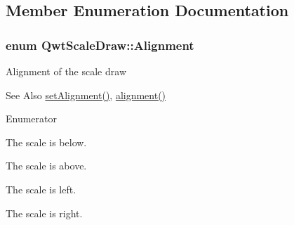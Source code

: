 \subsection{Member Enumeration Documentation}
\hypertarget{class_qwt_scale_draw_acd7ceeeac592ef08530788580b461c66}{
\subsubsection[{Alignment}]{\setlength{\rightskip}{0pt plus 5cm}enum {\bf Qwt\-Scale\-Draw\-::\-Alignment}}}\label{class_qwt_scale_draw_acd7ceeeac592ef08530788580b461c66}
Alignment of the scale draw \begin{DoxySeeAlso}{See Also}
\hyperlink{class_qwt_scale_draw_a7a4de0055dc1358e55c3357366a54091}{set\-Alignment()}, \hyperlink{class_qwt_scale_draw_ad0425d29e919f60021322b178661b6e5}{alignment()} 
\end{DoxySeeAlso}
\begin{Desc}
\item[Enumerator]\par
\begin{description}
\item[{\em 
\hypertarget{class_qwt_scale_draw_acd7ceeeac592ef08530788580b461c66a0e16389e135da75f06117d1ee3ef765f}{Bottom\-Scale}\label{class_qwt_scale_draw_acd7ceeeac592ef08530788580b461c66a0e16389e135da75f06117d1ee3ef765f}
}]The scale is below. \item[{\em 
\hypertarget{class_qwt_scale_draw_acd7ceeeac592ef08530788580b461c66a2386da707d8f736701b8ab98f778648c}{Top\-Scale}\label{class_qwt_scale_draw_acd7ceeeac592ef08530788580b461c66a2386da707d8f736701b8ab98f778648c}
}]The scale is above. \item[{\em 
\hypertarget{class_qwt_scale_draw_acd7ceeeac592ef08530788580b461c66af2a8239964381f18dbd08d4a93a7fa23}{Left\-Scale}\label{class_qwt_scale_draw_acd7ceeeac592ef08530788580b461c66af2a8239964381f18dbd08d4a93a7fa23}
}]The scale is left. \item[{\em 
\hypertarget{class_qwt_scale_draw_acd7ceeeac592ef08530788580b461c66a84d42042d94ae7726395ceb578225e1e}{Right\-Scale}\label{class_qwt_scale_draw_acd7ceeeac592ef08530788580b461c66a84d42042d94ae7726395ceb578225e1e}
}]The scale is right. \end{description}
\end{Desc}


